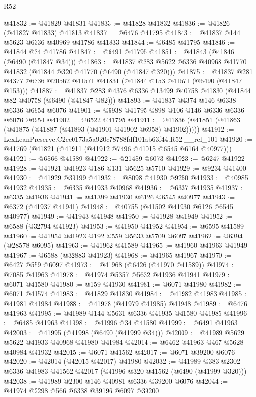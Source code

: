 \begin{lexlean}{R52}
\begin{coremodule}
@41832 := @41829 @41831
@41833 := @41828 @41832
@41836 := @41826 (@41827 @41833) @41813
@41837 := @6476 @41795
@41843 := @41837 @144 @5623 @6336 @40969 @41786 @41833
@41844 := @6485 @41795
@41846 := @41844 @34 @41786
@41847 := @6491 @41795
@41851 := @41843 (@41846 (@6490 (@41847 @34)))
@41863 := @41837 @383 @5622 @6336 @40968 @41770 @41832 (@41844 @320 @41770 (@6490 (@41847 @320)))
@41875 := @41837 @281 @4377 @6336 @20562 @41571 @41831 (@41844 @153 @41571 (@6490 (@41847 @153)))
@41887 := @41837 @283 @4376 @6336 @13499 @40758 @41830 (@41844 @82 @40758 (@6490 (@41847 @82)))
@41893 := @41837 @4374 @146 @6338 @6336 @6954 @6076
@41901 := @6938 @41795 @898 @106 @146 @6336 @6336 @6076 @6954
@41902 := @6522 @41795
@41911 := @41836 (@41851 (@41863 (@41875 (@41887 (@41893 (@41901 @41902 @6958) @41902)))))
@41912 := LexLeanPreserve.C2ee0173a5a920c78788fdf101ab63f44.R52.__rel_101
@41920 := @41769 (@41821 (@41911 (@41912 @7496 @41015 @6545 @6164 @40977)))
@41921 := @6566 @41589
@41922 := @21459 @6073
@41923 := @6247 @41922
@41928 := @41921 @41923 @186 @131 @5625 @5710
@41929 := @9234 @41400
@41930 := @41929 @39199
@41932 := @8098 @41930 @9250
@41933 := @40985 @41932
@41935 := @6335 @41933 @40968
@41936 := @6337 @41935
@41937 := @6335 @41936
@41941 := @41399 @41930 @6126 @6545 @40977
@41943 := @6372 (@41937 @41941)
@41948 := @40755 (@41502 @41930 @6126 @6545 @40977)
@41949 := @41943 @41948
@41950 := @41928 @41949
@41952 := @6588 (@32794 @41923)
@41953 := @41950 @41952
@41954 := @6595 @41589
@41960 := @41954 @41923 @192 @559 @5633 @5709 @6097
@41962 := @6394 (@28578 @6095)
@41963 := @41962 @41589
@41965 := @41960 @41963 @41949
@41967 := @6588 (@32883 @41923)
@41968 := @41965 @41967
@41970 := @6427 @559 @6097
@41973 := @41968 (@6426 (@41970 @41589))
@41974 := @7085 @41963
@41978 := @41974 @5357 @5632 @41936 @41941
@41979 := @6071 @41580
@41980 := @159 @41930
@41981 := @6071 @41980
@41982 := @6071 @41574
@41983 := @41829 @41830
@41984 := @41982 @41983
@41985 := @41981 @41984
@41988 := @41978 (@41979 @41985) @41948
@41989 := @6476 @41963
@41995 := @41989 @144 @5631 @6336 @41935 @41580 @41985
@41996 := @6485 @41963
@41998 := @41996 @34 @41580
@41999 := @6491 @41963
@42003 := @41995 (@41998 (@6490 (@41999 @34)))
@42009 := @41989 @5629 @5622 @41933 @40968 @41980 @41984
@42014 := @6462 @41963 @467 @5628 @40984 @41932
@42015 := @6071 @41562
@42017 := @6071 @39200 @6076
@42020 := @42014 (@42015 @42017) @41980
@42032 := @41989 @383 @2302 @6336 @40983 @41562 @42017 (@41996 @320 @41562 (@6490 (@41999 @320)))
@42038 := @41989 @2300 @146 @40981 @6336 @39200 @6076
@42044 := @41974 @2298 @566 @6338 @39196 @6097 @39200

\end{coremodule}
\end{lexlean}

